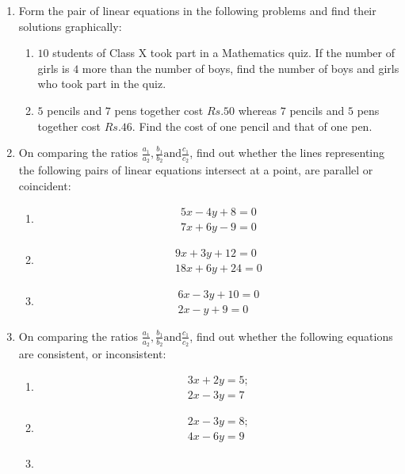 \begin{enumerate}
\item Form the pair of linear equations in the following problems and find their solutions graphically:
\begin{enumerate}[label=(\roman*)]
\item $10$ students of Class X took part in a Mathematics quiz. If the number of girls is $4$ more than the number of boys, find the number of boys and girls who took part in the quiz.
\item $5$ pencils and $7$ pens together cost $Rs. 50$ whereas $7$ pencils and $5$ pens together cost $Rs.46$. Find the cost of one pencil and that of one pen.
\end{enumerate}
\item On comparing the ratios $\frac{a_{1}}{a_2},\frac{b_1}{b_2} \text{and} \frac{c_1}{c_2}$, find out whether the lines representing the following pairs of linear equations intersect at a point, are parallel or coincident:
\begin{enumerate}[label=(\roman*)]
\item \begin{align}
	5x-4y+8=0\\ 
      	7x+6y-9=0
	\end{align}
\item \begin{align}
	9x+3y+12=0\\
	18x+6y+24=0
	\end{align}
\item \begin{align}
        6x-3y+10=0\\
	2x-y+9=0
	\end{align}
\end{enumerate}
\item On comparing the ratios $\frac{a_1}{a_2},\frac{b_1}{b_2} \text{and} \frac {c_1}{c_2}$, find out whether the following equations are consistent, or inconsistent:
\begin{enumerate}[label=(\roman*)]
	\item \begin{align}
       		3x+2y=5; \\
      		2x-3y=7
    	       \end{align} 
	\item \begin{align}
		2x-3y=8;\\
		4x-6y=9
		\end{align}
	\item \begin{align}

\end{align}
\end{enumerate}
\end{enumerate}

